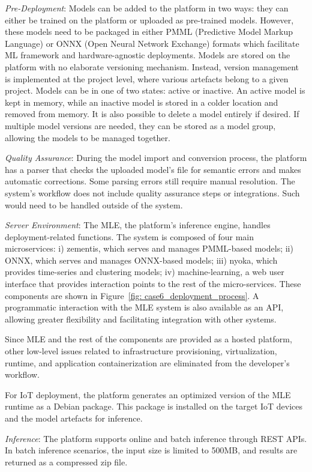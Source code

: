 \textit{Pre-Deployment}: Models can be added to the platform in two ways: they can either be trained on the platform or uploaded as pre-trained models. However, these models need to be packaged in either PMML (Predictive Model Markup Language) or ONNX (Open Neural Network Exchange) formats which facilitate ML framework and hardware-agnostic deployments. Models are stored on the platform with no elaborate versioning mechanism. Instead, version management is implemented at the project level, where various artefacts belong to a given project. Models can be in one of two states: active or inactive. An active model is kept in memory, while an inactive model is stored in a colder location and removed from memory. It is also possible to delete a model entirely if desired. If multiple model versions are needed, they can be stored as a model group, allowing the models to be managed together. 

\textit{Quality Assurance}: During the model import and conversion process, the platform has a parser that checks the uploaded model's file for semantic errors and makes automatic corrections. Some parsing errors still require manual resolution. The system’s workflow does not include quality assurance steps or integrations. Such would need to be handled outside of the system. %

\textit{Server Environment}: The MLE, the platform's inference engine, handles deployment-related functions. The system is composed of four main microservices: i) zementis, which serves and manages PMML-based models; ii) ONNX, which serves and manages ONNX-based models; iii) nyoka, which provides time-series and clustering models; iv) machine-learning, a web user interface that provides interaction points to the rest of the micro-services. These components are shown in Figure~\ref{fig: case6_deployment_process}. A programmatic interaction with the MLE system is also available as an API, allowing greater flexibility and facilitating integration with other systems.

Since MLE and the rest of the components are provided as a hosted platform, other low-level issues related to infrastructure provisioning, virtualization, runtime, and application containerization are eliminated from the developer’s workflow.

For IoT deployment, the platform generates an optimized version of the MLE runtime as a Debian package. This package is installed on the target IoT devices and the model artefacts for inference.

\textit{Inference}: The platform supports online and batch inference through REST APIs. In batch inference scenarios, the input size is limited to 500MB, and results are returned as a compressed zip file. 


